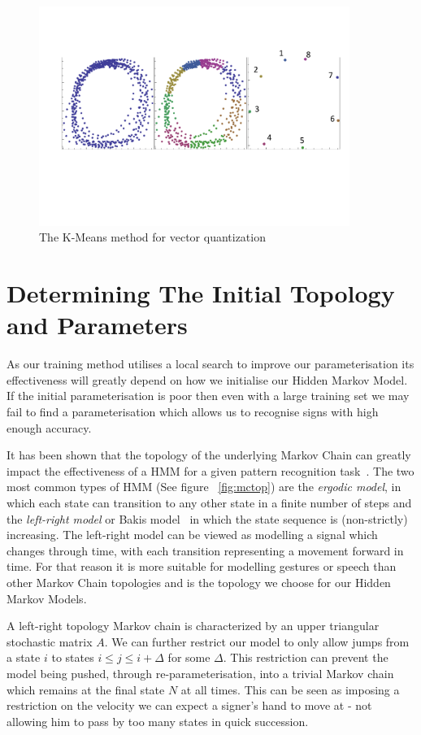 \begin{figure}
        \centering
        \includegraphics[width=0.9\textwidth]{ThesisFigs/ClusteringDiag}
        \caption{The K-Means method for vector quantization}\label{fig:kmeans}
\end{figure}

\section{Determining The Initial Topology and Parameters}
As our training method utilises a local search to improve our parameterisation its effectiveness will greatly depend on how we initialise our Hidden Markov Model. If the initial parameterisation is poor then even with a large training set we may fail to find a parameterisation which allows us to  recognise signs with high enough accuracy.

It has been shown that the topology of the underlying Markov Chain can greatly impact the effectiveness of a HMM for a given pattern recognition task~\citep{rabiner1989tutorial, jelinek1998statistical}. The two most common types of HMM (See figure ~\ref{fig:mctop}) are the \emph{ergodic model}, in which each state can transition to any other state in a finite number of steps and the \emph{left-right model} or Bakis model~\citep{bakis1976continuous} in which the state sequence is (non-strictly) increasing. The left-right model can be viewed as modelling a signal which changes through time, with each transition representing a movement forward in time. For that reason it is more suitable for modelling gestures or speech than other Markov Chain topologies and is the topology we choose for our Hidden Markov Models.

A left-right topology Markov chain is characterized by an upper triangular stochastic matrix $A$. We can further restrict our model to only allow jumps from a state $i$ to states $i \leq j \leq i+\Delta$ for some $\Delta$. This restriction can prevent the model being pushed, through re-parameterisation, into a trivial Markov chain which remains at the final state $N$ at all times. This can be seen as imposing a restriction on the velocity we can expect a signer's hand to move at - not allowing him to pass by too many states in quick succession.

